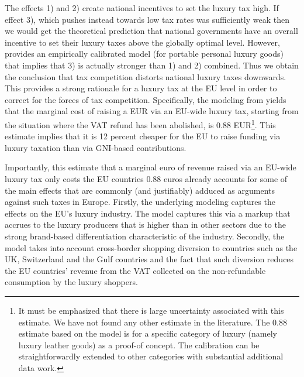 \documentclass{article}
\begin{document}
The effects 1) and 2) create national incentives to set the luxury tax high. If effect 3), which pushes instead towards low tax rates was sufficiently weak then we would get the theoretical prediction that national governments have an overall incentive to set their luxury taxes above the globally optimal level. However,\citet{Xie2026} provides an empirically calibrated model (for portable personal luxury goods) that implies that 3) is actually stronger than 1) and 2) combined.  Thus we obtain the conclusion that tax competition distorts national luxury taxes downwards. This provides a strong rationale for a luxury tax at the EU level in order to correct for the forces of tax competition. Specifically, the modeling from \citet{Xie2026} yields that the marginal cost of raising a EUR via an EU-wide luxury tax, starting from the situation where the VAT refund has been abolished, is 0.88 EUR\footnote{It must be emphasized that there is large uncertainty associated with this estimate. We have not found any other estimate in the literature. The 0.88 estimate based on the model  \citet{Xie2026} is for a specific category of luxury (namely luxury leather goods) as a proof-of concept. The calibration can be straightforwardly extended to other categories with substantial additional data work.}. This estimate implies that it is 12 percent cheaper for the EU to raise funding via luxury taxation  than via GNI-based contributions. 

Importantly, this estimate that a marginal euro of revenue raised via an EU-wide luxury tax only costs the EU countries 0.88 euros already accounts for some of the main effects that are commonly (and justifiably) adduced as arguments against such taxes in Europe. Firstly, the underlying modeling captures the effects on the EU's luxury industry. The model captures this via a markup that accrues to the luxury producers that is higher than in other sectors due to the strong brand-based differentiation characteristic of the industry. 
Secondly, the model takes into account cross-border shopping diversion to countries such as the UK, Switzerland and the Gulf countries and the fact that such diversion reduces the EU countries' revenue from the VAT collected on the non-refundable consumption by the luxury shoppers.

\end{document}
